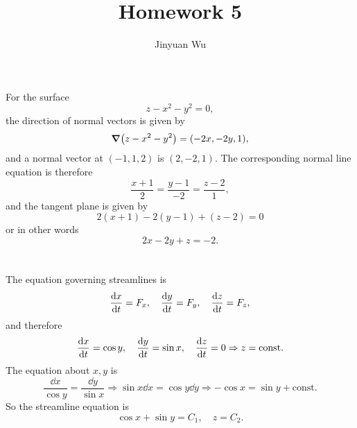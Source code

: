 \documentclass[hyperref, a4paper]{article}
\title{Homework 5}
\author{Jinyuan Wu}
\newcommand*{\const}{\mathrm{const}}
\begin{document}
\maketitle

\section{}

For the surface 
\begin{equation}
    z - x^2 - y^2 = 0,
\end{equation}
the direction of normal vectors is given by 
\begin{equation}
    \grad(z - x^2 - y^2)
    = (-2x, -2y, 1),
\end{equation} 
and a normal vector at $(-1, 1, 2)$ is $(2, -2, 1)$.
The corresponding normal line equation is therefore 
\begin{equation}
    \frac{x + 1}{2} = \frac{y - 1}{-2} = \frac{z - 2}{1},
\end{equation}
and the tangent plane is given by 
\begin{equation}
    2 (x + 1) - 2 (y - 1) + (z - 2) = 0
\end{equation}
or in other words 
\begin{equation}
    2 x - 2y + z = -2.
\end{equation}

\section{}

The equation governing streamlines is 
\begin{equation}
    \dv{x}{t} = F_x, \quad \dv{y}{t} = F_y, \quad \dv{z}{t} = F_z,
\end{equation}
and therefore 
\begin{equation}
    \dv{x}{t} = \cos y, \quad \dv{y}{t} = \sin x, \quad \dv{z}{t} = 0
    \Rightarrow z = \const.
\end{equation}
The equation about $x, y$ is 
\begin{equation}
    \frac{\dd{x}}{\cos y} = \frac{\dd{y}}{\sin x} \Rightarrow
    \sin x \dd{x} = \cos y \dd{y} \Rightarrow
    - \cos x = \sin y + \const.
\end{equation}
So the streamline equation is 
\begin{equation}
    \cos x + \sin y = C_1, \quad z = C_2.
\end{equation}
\end{document}
